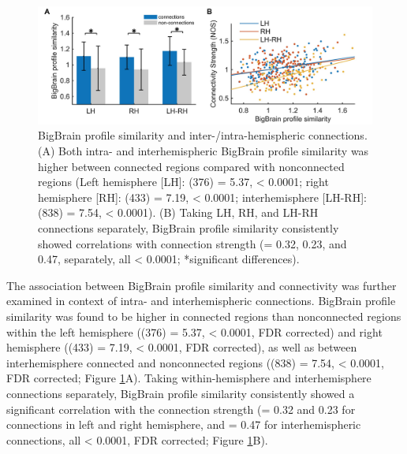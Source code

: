 \begin{refsection}
\begin{figure}[h]
    \centering
    \includegraphics[width=12cm]{images/thesis_bb_fig4.jpg}
    \caption{BigBrain profile similarity and inter-/intra-hemispheric connections. (A) Both intra- and interhemispheric BigBrain profile similarity was higher between connected regions compared with nonconnected regions (Left hemisphere [LH]: \tvaldf(376) = 5.37, \pval < 0.0001; right hemisphere [RH]: \tvaldf(433) = 7.19, \pval < 0.0001; interhemisphere [LH-RH]: \tvaldf(838) = 7.54, \pval < 0.0001). (B) Taking LH, RH, and LH-RH connections separately, BigBrain profile similarity consistently showed correlations with connection strength (\rval = 0.32, 0.23, and 0.47, separately, all \pval < 0.0001; *significant differences).}
    \label{bigbrainFig4}
\end{figure}

The association between BigBrain profile similarity and connectivity was further examined in context of intra- and interhemispheric connections. BigBrain profile similarity was found to be higher in connected regions than nonconnected regions within the left hemisphere (\tvaldf(376) = 5.37, \pval < 0.0001, FDR corrected) and right hemisphere (\tvaldf(433) = 7.19, \pval < 0.0001, FDR corrected), as well as between interhemisphere connected and nonconnected regions (\tvaldf(838) = 7.54, \pval < 0.0001, FDR corrected; Figure \ref{bigbrainFig4}A). Taking within-hemisphere and interhemisphere connections separately, BigBrain profile similarity consistently showed a significant correlation with the connection strength (\rval = 0.32 and 0.23 for connections in left and right hemisphere, and \rval = 0.47 for interhemispheric connections, all \pval < 0.0001, FDR corrected; Figure \ref{bigbrainFig4}B).


\end{refsection}

